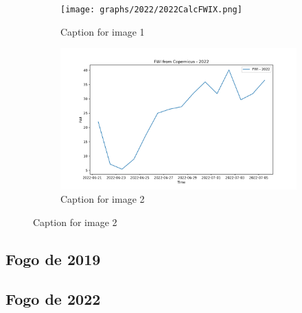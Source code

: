 \begin{figure}[h]
	\caption{HELLo}
	\centering
	\begin{subfigure}{0.49\textwidth}
		\centering
		\texttt{[image: graphs/2022/2022CalcFWIX.png]}
		\caption{Caption for image 1}
		\label{fig:img1}
	\end{subfigure}
	\hfill
	\begin{subfigure}{0.49\textwidth}
		\centering
		\includegraphics[width=\textwidth]{graphs/2022/2022CopernicusFWI12.png}
		\caption{Caption for image 2}
		\label{fig:img2}
	\end{subfigure}
	\label{fig:both_images}
\end{figure}

\FloatBarrier

\subsection{Fogo de 2019}

\FloatBarrier

\subsection{Fogo de 2022}

